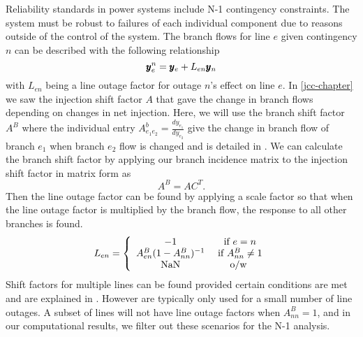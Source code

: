 Reliability standards in power systems include N-1 contingency constraints.  The system must be robust to failures of each individual component due to reasons outside of the control of the system. The branch flows for line $e$ given contingency $n$ can be described with the following relationship
\begin{equation}\label{n1cont}
 \pmb{y}_e^n = \pmb{y}_e + L_{e n} \pmb{y}_n 
\end{equation}
with $L_{en}$ being a line outage factor for outage $n$'s effect on line $e$.  In \cref{jcc-chapter} we saw the injection shift factor $A$ that gave the change in branch flows depending on changes in net injection.  Here, we will use the branch shift factor $A^B$ where the individual entry $A_{e_1 e_2}^b = \frac{ dy_{e_1}}{dy_{e_2}}$ give the change in branch flow of branch $e_1$ when branch $e_2$ flow is changed and is detailed in \cite{matpower}.  We can calculate the branch shift factor by applying our branch incidence matrix to the injection shift factor in matrix form as 
\begin{equation}
A^B = A C^T.
\end{equation}
 Then the line outage factor can be found by applying a scale factor so that when the line outage factor is multiplied by the branch flow, the response to all other branches is found.  
\begin{equation}\label{line_outage}
L_{en} = \left\{ \begin{array}{c c}
  -1 & \mbox{ if } e=n\\
  A_{en}^B (1-A_{nn}^B)^{-1} & \mbox{ if } A_{nn}^B \neq 1\\
  \mbox{NaN} & \mbox{ o/w }
  \end{array}
\right.
\end{equation}
Shift factors for multiple lines can be found provided certain conditions are met and are explained in \cite{guler_2007}.  However are typically only used for a small number of line outages.  A subset of lines will not have line outage factors when $A_{nn}^B = 1$, and in our computational results, we filter out these scenarios for the N-1 analysis.


